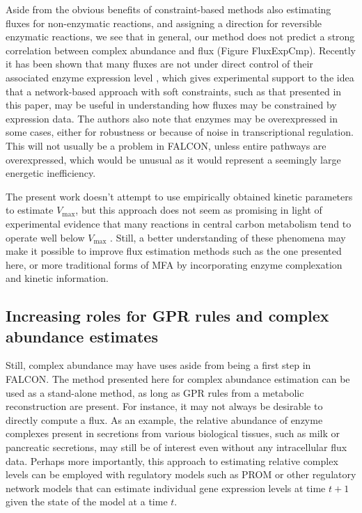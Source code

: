 Aside from the obvious benefits
of constraint-based methods also estimating fluxes for non-enzymatic
reactions, and assigning a direction for reversible enzymatic
reactions, we see that in general, our method does not predict a
strong correlation between complex abundance and flux
(Figure FluxExpCmp). Recently it has been shown that many fluxes are not
under direct control of their associated enzyme expression
level \citep{Chubukov2013}, which gives experimental support to the
idea that a network-based approach with soft constraints, such as that
presented in this paper, may be useful in understanding how fluxes may
be constrained by expression data. The authors also note that enzymes
may be overexpressed in some cases, either for robustness or because
of noise in transcriptional regulation. This will not usually be a
problem in FALCON, unless entire pathways are overexpressed, which
would be unusual as it would represent a seemingly large energetic
inefficiency.

The present work doesn't attempt to use empirically
obtained kinetic parameters to estimate $V_{\max}$, but this approach
does not seem as promising in light of experimental evidence that many
reactions in central carbon metabolism tend to operate well below
$V_{\max}$ \citep{Bennett2009}. Still, a better understanding of these
phenomena may make it possible to improve flux estimation methods such
as the one presented here, or more traditional forms of MFA
\citep{Shestov2013a} by incorporating enzyme complexation and kinetic
information.



\subsection{Increasing roles for GPR rules and complex abundance estimates}
Still, complex abundance may have uses aside from being a first
step in FALCON. The method presented here for complex abundance
estimation can be used as a stand-alone method, as long as GPR
rules from a metabolic reconstruction are present. For instance, it
may not always be desirable to directly compute a flux. As an example,
the relative abundance of enzyme complexes present in secretions
from various biological tissues, such as milk or pancreatic
secretions, may still be of interest even without any intracellular
flux data. Perhaps more importantly, this approach to estimating
relative complex levels can be employed with regulatory models such as
PROM \citep{Chandrasekaran2010a} or other regulatory network models
that can estimate individual gene expression levels at time $t+1$
given the state of the model at a time $t$.

